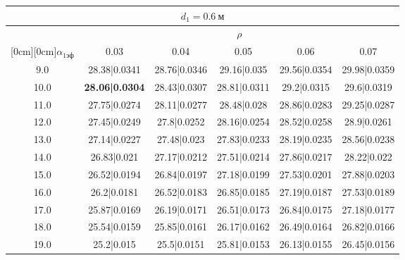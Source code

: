 \documentclass[20pt]{article}
\begin{document}
\begin{center}
\begin{tabular}{c|ccccc}
\hline
	\multicolumn{6}{c}{$d_{1}=0.6 \ м$} \\
\hline
	 & \multicolumn{5}{|c}{$\rho$} \\
	\cline{2-6}
	\raisebox{1.5ex}[0cm][0cm]{$\alpha_{1эф}$} & 0.03 & 0.04 & 0.05 & 0.06 & 0.07\\
\hline
	9.0 & 	28.38|0.0341 & 	28.76|0.0346 & 	29.16|0.035 & 	29.56|0.0354 & 	29.98|0.0359\\
	10.0 & 	\textbf{28.06|0.0304} & 	28.43|0.0307 & 	28.81|0.0311 & 	29.2|0.0315 & 	29.6|0.0319\\
	11.0 & 	27.75|0.0274 & 	28.11|0.0277 & 	28.48|0.028 & 	28.86|0.0283 & 	29.25|0.0287\\
	12.0 & 	27.45|0.0249 & 	27.8|0.0252 & 	28.16|0.0254 & 	28.52|0.0258 & 	28.9|0.0261\\
	13.0 & 	27.14|0.0227 & 	27.48|0.023 & 	27.83|0.0233 & 	28.19|0.0235 & 	28.56|0.0238\\
	14.0 & 	26.83|0.021 & 	27.17|0.0212 & 	27.51|0.0214 & 	27.86|0.0217 & 	28.22|0.022\\
	15.0 & 	26.52|0.0194 & 	26.84|0.0197 & 	27.18|0.0199 & 	27.53|0.0201 & 	27.88|0.0203\\
	16.0 & 	26.2|0.0181 & 	26.52|0.0183 & 	26.85|0.0185 & 	27.19|0.0187 & 	27.53|0.0189\\
	17.0 & 	25.87|0.0169 & 	26.19|0.0171 & 	26.51|0.0173 & 	26.84|0.0175 & 	27.18|0.0177\\
	18.0 & 	25.54|0.0159 & 	25.85|0.0161 & 	26.17|0.0162 & 	26.49|0.0164 & 	26.82|0.0166\\
	19.0 & 	25.2|0.015 & 	25.5|0.0151 & 	25.81|0.0153 & 	26.13|0.0155 & 	26.45|0.0156\\
\end{tabular}


\end{center}
\end{document}
